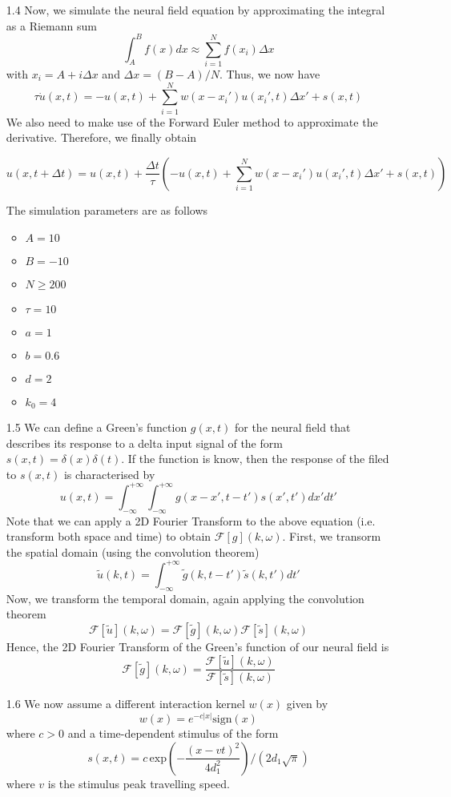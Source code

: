 \documentclass[12pt]{article}
\begin{document}
\begin{enumerate}
\item[1.4] Now, we simulate the neural field equation by approximating the integral as a Riemann sum
\[
    \int_{A}^{B}f(x)dx \approx \sum_{i=1}^{N} f(x_{i})\Delta x
\]   
with $x_{i} = A + i\Delta x$ and $\Delta x=(B-A)/N$. Thus, we now have
\[
    \tau \dot{u}(x, t) =   -u(x, t) + \sum_{i=1}^{N} w(x-x_{i}')u(x_{i}', t)\Delta x' + s(x, t)
\]
We also need to make use of the Forward Euler method to approximate the derivative. Therefore, we finally obtain

\[
    u(x, t+\Delta t) =  u(x, t) + \frac{\Delta t}{\tau}\left(-u(x, t) + \sum_{i=1}^{N} w(x-x_{i}')u(x_{i}', t)\Delta x' + s(x, t)\right)
\]

The simulation parameters are as follows
\begin{itemize}
    \item $A = 10$
    \item $B = -10$
    \item $N \geq 200$
    \item $\tau = 10$
    \item $a = 1$
    \item $b=0.6$
    \item $d=2$
    \item $k_{0}=4$
\end{itemize}
\item[1.5] We can define a Green's function $g(x, t)$ for the neural field that describes its response to a delta input signal of the form $s(x,t) = \delta(x)\delta(t)$. 
 If the function is know, then the response of the filed to $s(x, t)$ is characterised by
 \[
    u(x, t) = \int_{-\infty}^{+\infty} \int_{-\infty}^{+\infty} g(x-x', t-t')s(x', t')dx'dt'
 \]
Note that we can apply a 2D Fourier Transform to the above equation (i.e. transform both space and time) to obtain $\mathcal{F}[g](k, \omega)$.
First, we transorm the spatial domain (using the convolution theorem)
\[
    \widetilde{u}(k, t) = \int_{-\infty}^{+\infty} \widetilde{g}(k, t-t')\widetilde{s}(k, t')dt'
\]
Now, we transform the temporal domain, again applying the convolution theorem
\[
    \mathcal{F}[\tilde{u}](k, \omega) = \mathcal{F}[\tilde{g}](k, \omega)\mathcal{F}[\tilde{s}](k, \omega)
\]
Hence, the 2D Fourier Transform of the Green's function of our neural field is
\[
    \mathcal{F}[\tilde{g}](k, \omega) = \frac{\mathcal{F}[\tilde{u}](k, \omega)}{\mathcal{F}[\tilde{s}](k, \omega)}
\]
\item[1.6] We now assume a different interaction kernel $w(x)$ given by
\[
    w(x) = e^{-c|x|}\text{sign}(x)  
\] 
where $c>0$ and a time-dependent stimulus of the form
\[
    s(x, t) = c\,\text{exp}\left(-\frac{(x-vt)^{2}}{4d_{1}^{2}}\right)/(2d_{1}\sqrt{\pi})
\]
where $v$ is the stimulus peak travelling speed.
\end{enumerate}
\end{document}
